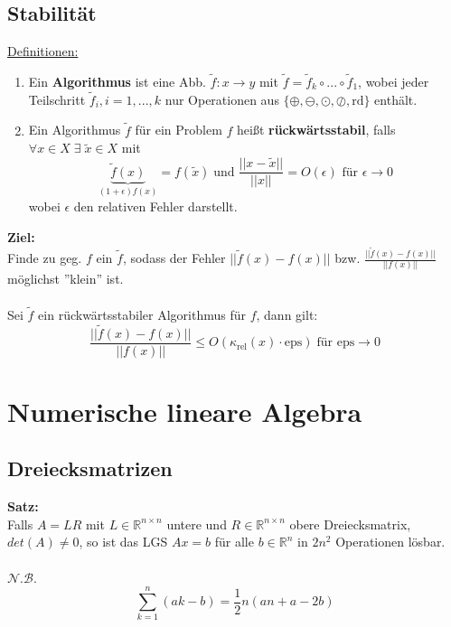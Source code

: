 \documentclass[a4paper,twocolumn,10pt]{article}
\begin{document}
\subsection{Stabilität}
\underline{Definitionen:}
\begin{enumerate}[label=$\bullet$]
\item Ein \textbf{Algorithmus} ist eine Abb. $\tilde{f}:x\rightarrow y$ mit $\tilde{f}=\tilde{f}_k\circ ...\circ \tilde{f}_1$, wobei jeder Teilschritt $\tilde{f}_i,i=1,...,k$ nur Operationen aus $\{\oplus ,\ominus,\odot,\oslash,\text{rd}\}$ enthält.
\item Ein Algorithmus $\tilde{f}$ für ein Problem $f$ heißt \textbf{rückwärtsstabil}, falls $\forall x\in X\;\exists\;\tilde{x}\in X$ mit
\begin{equation*}
\underbrace{\tilde{f}(x)}_{(1+\epsilon)f(x)}=f(\tilde{x})\;\text{und}\;\frac{||x-\tilde{x}||}{||x||} = O(\epsilon)\text{ für }\epsilon\rightarrow 0
\end{equation*}
wobei $\epsilon$ den relativen Fehler darstellt.
\end{enumerate}
\textbf{Ziel:}\\
Finde zu geg. $f$ ein $\tilde{f}$, sodass der Fehler $||\tilde{f}(x)-f(x)||$ bzw. $\frac{||\tilde{f}(x)-f(x)||}{||f(x)||}$ möglichst ''klein'' ist.\\\\
Sei $\tilde{f}$ ein rückwärtsstabiler Algorithmus für $f$, dann gilt:
\begin{equation*}
\frac{||\tilde{f}(x)-f(x)||}{||f(x)||}\leq O(\kappa_{\text{rel}}(x)\cdot \text{eps})\;\text{für eps}\rightarrow 0
\end{equation*}

\section{Numerische lineare Algebra}

\subsection{Dreiecksmatrizen}
\textbf{Satz:}\\
Falls $A=LR$ mit $L\in\mathbb{R}^{n\times n}$ untere und $R\in\mathbb{R}^{n\times n}$ obere Dreiecksmatrix, $det(A)\neq 0$, so ist das LGS $Ax=b$ für alle $b\in\mathbb{R}^n$ in $2n^2$ Operationen lösbar.\\\\
$\mathcal{N.B.}$
\begin{equation*}
\sum\limits_{k=1}^{n}(ak-b)=\frac{1}{2}n(an+a-2b)
\end{equation*}
\end{document}
